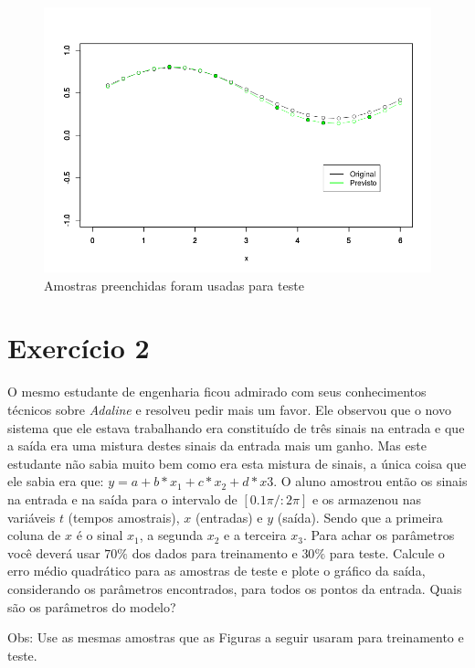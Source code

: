 \documentclass[paper=a4, fontsize=11pt]{scrartcl} %
\begin{document}
\begin{figure}
	\centering
	\includegraphics[width=0.7\linewidth]{Ex1b}
	\caption{Amostras preenchidas foram usadas para teste}
	\label{fig:Ex1b}
\end{figure}

\pagebreak
 
\section*{Exercício 2}
O mesmo estudante de engenharia ficou admirado com seus conhecimentos técnicos sobre \textit{Adaline} e resolveu pedir mais um favor. Ele observou que o novo sistema que ele estava trabalhando era constituído de três sinais na entrada e que a saída era uma mistura destes sinais da entrada mais um ganho. Mas este estudante não sabia muito bem como era esta mistura de sinais, a única coisa que ele sabia era que: $y = a + b*x_1 + c*x_2 + d*x3$. O aluno amostrou então os sinais na entrada e na saída para o intervalo de $[0.1\pi/:2\pi]$ e os armazenou nas variáveis $t$ (tempos amostrais), $x$ (entradas) e $y$ (saída). Sendo que a primeira coluna de $x$ é o sinal $x_1$, a segunda $x_2$ e a terceira $x_3$. Para achar os parâmetros você deverá usar $70\%$ dos dados para treinamento e $30\%$ para teste. Calcule o erro médio quadrático para as amostras de teste e plote o gráfico da saída, considerando os parâmetros encontrados, para todos os pontos da entrada. Quais são os parâmetros do modelo?
\par Obs: Use as mesmas amostras que as Figuras a seguir usaram para treinamento e teste.
\end{document}
